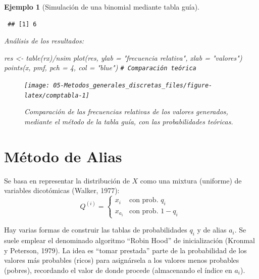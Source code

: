 \documentclass[
]{book}
\newenvironment{Shaded}{\begin{snugshade}}{\end{snugshade}}
\newcommand{\AttributeTok}[1]{\textcolor[rgb]{0.77,0.63,0.00}{#1}}
\newcommand{\CommentTok}[1]{\textcolor[rgb]{0.56,0.35,0.01}{\textit{#1}}}
\newcommand{\DecValTok}[1]{\textcolor[rgb]{0.00,0.00,0.81}{#1}}
\newcommand{\FunctionTok}[1]{\textcolor[rgb]{0.00,0.00,0.00}{#1}}
\newcommand{\NormalTok}[1]{#1}
\newcommand{\OtherTok}[1]{\textcolor[rgb]{0.56,0.35,0.01}{#1}}
\newcommand{\SpecialCharTok}[1]{\textcolor[rgb]{0.00,0.00,0.00}{#1}}
\newcommand{\StringTok}[1]{\textcolor[rgb]{0.31,0.60,0.02}{#1}}
\theoremstyle{break}
\newtheorem{example}{Ejemplo}[chapter]
\theoremstyle{nonumberplain}
\renewcommand{\CommentTok}[1]{\textcolor[rgb]{0.41,0.41,0.41}{\texttt{#1}}}
\begin{document}
\begin{example}[Simulación de una binomial mediante tabla guía]
\begin{verbatim}
 ## [1] 6
\end{verbatim}

Análisis de los resultados:

\begin{Shaded}
\begin{Highlighting}[]
\NormalTok{res }\OtherTok{\textless{}{-}} \FunctionTok{table}\NormalTok{(rx)}\SpecialCharTok{/}\NormalTok{nsim}
\FunctionTok{plot}\NormalTok{(res, }\AttributeTok{ylab =} \StringTok{"frecuencia relativa"}\NormalTok{, }\AttributeTok{xlab =} \StringTok{"valores"}\NormalTok{)}
\FunctionTok{points}\NormalTok{(x, pmf, }\AttributeTok{pch =} \DecValTok{4}\NormalTok{, }\AttributeTok{col =} \StringTok{"blue"}\NormalTok{)  }\CommentTok{\# Comparación teórica}
\end{Highlighting}
\end{Shaded}

\begin{figure}[!htb]

{\centering \texttt{[image: 05-Metodos\_generales\_discretas\_files/figure-latex/comptabla-1]} 

}

\caption{Comparación de las frecuencias relativas de los valores generados, mediante el método de la tabla guía, con las probabilidades teóricas.}\label{fig:comptabla}
\end{figure}

\end{example}

\hypertarget{alias}{%
\section{Método de Alias}\label{alias}}

Se basa en representar la distribución de \(X\) como una mixtura
(uniforme) de variables dicotómicas (Walker, 1977):
\[Q^{(i)}=\left\{ 
\begin{array}{ll}
x_{i} & \text{con prob. } q_{i} \\ 
x_{a_{i}} & \text{con prob. } 1-q_{i}
\end{array}
\ \right.\]

Hay varias formas de construir las tablas de probabilidades \(q_i\) y de alias \(a_i\).
Se suele emplear el denominado algoritmo ``Robin Hood'' de inicialización (Kronmal y Peterson, 1979).
La idea es ``tomar prestada'' parte de la probabilidad de los valores más probables (ricos) para asignársela a los valores menos probables (pobres), recordando el valor de donde procede (almacenando el índice en \(a_i\)).
\end{document}
